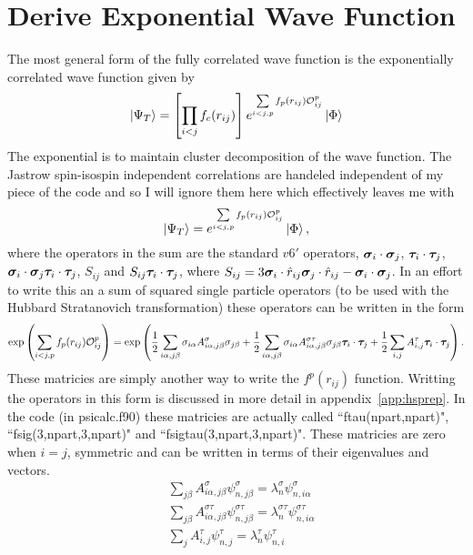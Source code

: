 \section{Derive Exponential Wave Function}
The most general form of the fully correlated wave function is the exponentially correlated wave function given by
\begin{equation}
   \left| \Psi_T \right> = \left[\prod\limits_{i<j}f_c(r_{ij})\right] e^{\sum\limits_{i<j,p}f_p(r_{ij})\mathcal{O}^p_{ij}} \left| \Phi \right>
\end{equation}
The exponential is to maintain cluster decomposition of the wave function. The Jastrow spin-isospin independent correlations are handeled independent of my piece of the code and so I will ignore them here which effectively leaves me with
\begin{equation}
   \left| \Psi_T \right> = e^{\sum\limits_{i<j,p}f_p(r_{ij})\mathcal{O}^p_{ij}} \left| \Phi \right>,
\end{equation}
where the operators in the sum are the standard $v6'$ operators, $\bm{\sigma}_i\cdot\bm{\sigma}_j$, $\bm{\tau}_i\cdot\bm{\tau}_j$, $\bm{\sigma}_i\cdot\bm{\sigma}_j \bm{\tau}_i\cdot\bm{\tau}_j$, $S_{ij}$ and $S_{ij} \bm{\tau}_i\cdot\bm{\tau}_j$, where $S_{ij} = 3\bm{\sigma}_i\cdot\hat{r}_{ij}\bm{\sigma}_j\cdot\hat{r}_{ij}-\bm{\sigma}_i\cdot\bm{\sigma}_j$. In an effort to write this an a sum of squared single particle operators (to be used with the Hubbard Stratanovich transformation) these operators can be written in the form
\begin{equation}
   \exp\left(\sum\limits_{i<j,p}f_p(r_{ij})\mathcal{O}^p_{ij}\right) = \exp\left(\frac{1}{2}\sum\limits_{i\alpha,j\beta} \sigma_{i\alpha}A^{\sigma}_{i\alpha,j\beta}\sigma_{j\beta}
      + \frac{1}{2}\sum\limits_{i\alpha,j\beta} \sigma_{i\alpha}A^{\sigma\tau}_{i\alpha,j\beta}\sigma_{j\beta}\bm{\tau}_i\cdot\bm{\tau}_j
      + \frac{1}{2}\sum\limits_{i,j} A^{\tau}_{i,j}\bm{\tau}_i\cdot\bm{\tau}_j\right).
\end{equation}
These matricies are simply another way to write the $f^p(r_{ij})$ function. Writting the operators in this form is discussed in more detail in appendix~\ref{app:hsprep}. In the code (in psicalc.f90) these matricies are actually called ``ftau(npart,npart)", ``fsig(3,npart,3,npart)" and ``fsigtau(3,npart,3,npart)". These matricies are zero when $i=j$, symmetric and can be written in terms of their eigenvalues and vectors.
\begin{align}
   &\sum\limits_{j\beta} A^{\sigma}_{i\alpha,j\beta}\psi^{\sigma}_{n,j\beta} = \lambda^{\sigma}_n\psi^{\sigma}_{n,i\alpha} \\
   &\sum\limits_{j\beta} A^{\sigma\tau}_{i\alpha,j\beta}\psi^{\sigma\tau}_{n,j\beta} = \lambda^{\sigma\tau}_n\psi^{\sigma\tau}_{n,i\alpha} \\
   &\sum\limits_{j} A^{\tau}_{i,j}\psi^{\tau}_{n,j} = \lambda^{\tau}_n\psi^{\tau}_{n,i}
\end{align}
